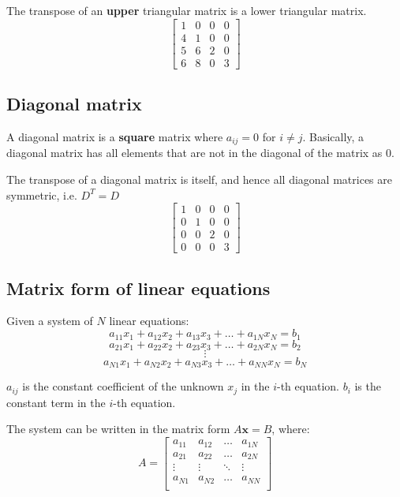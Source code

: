 \documentclass[11pt]{article}
\begin{document}
The transpose of an \textbf{upper} triangular matrix is a lower triangular matrix.
\begin{displaymath}
\begin{bmatrix}
1 & 0 & 0 & 0 \\
4 & 1 & 0 & 0 \\
5 & 6 & 2 & 0 \\
6 & 8 & 0 & 3
\end{bmatrix}
\end{displaymath}

 \newpage
\subsection{Diagonal matrix}
\label{sec:org931d468}
A diagonal matrix is a \textbf{square} matrix where \(a_{ij} = 0\) for \(i \neq j\). Basically, a diagonal matrix has all elements that are not in the diagonal of the matrix as 0.

The transpose of a diagonal matrix is itself, and hence all diagonal matrices are symmetric, i.e. \(D^{T} = D\)
\begin{displaymath}
\begin{bmatrix}
1 & 0 & 0 & 0 \\
0 & 1 & 0 & 0 \\
0 & 0 & 2 & 0 \\
0 & 0 & 0 & 3
\end{bmatrix}
\end{displaymath}
\subsection{Matrix form of linear equations}
\label{sec:orgcdbbe8f}
Given a system of \(N\) linear equations:
\[a_{11}x_1 + a_{12}x_2 + a_{13}x_3 + \ldots + a_{1N}x_{N} = b_1\]
\[a_{21}x_1 + a_{22}x_2 + a_{23}x_3 + \ldots + a_{2N}x_{N} = b_2\]
\[\vdots\]
\[a_{N1}x_1 + a_{N2}x_2 + a_{N3}x_3 + \ldots + a_{NN}x_{N} = b_N\]

\(a_{ij}\) is the constant coefficient of the unknown \(x_j\) in the \(i\)-th equation.
\(b_i\) is the constant term in the \(i\)-th equation.

The system can be written in the matrix form \(A \boldsymbol{x} = B\), where:
\begin{displaymath}
A = \begin{bmatrix}
a_{11} & a_{12} & \ldots & a_{1N} \\
a_{21} & a_{22} & \ldots & a_{2N} \\
\vdots & \vdots & \ddots & \vdots \\
a_{N1} & a_{N2} & \ldots & a_{NN} \\
\end{bmatrix}
\end{displaymath}
\end{document}
